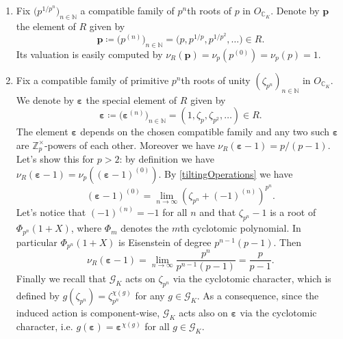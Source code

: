 \begin{ex}[]\leavevmode\vspace{-.2\baselineskip}\label{ExampleEltsTilt}
\begin{enumerate}
\item Fix $\big( p^{1/p^n} \big)_{n \in \mathbb{N}}$ 
	a compatible family of $p^n$th roots of $p$
	in $O_{\mathbb{C}_K}$.
	Denote by $\mathbf{p}$ the element of $R$ given by
	\begin{equation*}
		\mathbf{p} \coloneqq \big( p^{(n)} \big)_{n \in \mathbb{N}} =
		\big( p, p^{1/p}, p^{1/p^2}, \ldots \big) \in R
	.\end{equation*}
	Its valuation is easily computed by
	$\nu_R(\mathbf{p}) = \nu_p(p^{(0)}) = \nu_p(p) = 1$.

\item Fix a compatible family of primitive $p^n$th roots of unity
	$\left( \zeta_{p^n} \right)_{n \in \mathbb{N}}$ in $O_{\mathbb{C}_K}$.
	We denote by $\boldsymbol\varepsilon$ the special element of $R$ given by
	\begin{equation*}
		\boldsymbol\varepsilon \coloneqq \big( \boldsymbol\varepsilon^{(n)} \big)_{n \in \mathbb{N}} =
		\left( 1, \zeta_p, \zeta_{p^2}, \ldots \right) \in R
	.\end{equation*}
	The element $\boldsymbol\varepsilon$ depends on the chosen
	compatible family
	and any two such $\boldsymbol\varepsilon$
	are $\mathbb{Z}_{p}^{\times}$-powers of each other.
	Moreover we have
	$\nu_R \left( \boldsymbol\varepsilon - 1 \right) = p/ (p - 1)$.
	Let's show this for $p > 2$: by definition we have
	$\nu_R(\boldsymbol\varepsilon - 1) = \nu_p \left( (\boldsymbol\varepsilon -1 )^{(0)} \right)$.
	By \cref{tiltingOperations} we have
	\begin{equation*}
		\left( \boldsymbol\varepsilon -1 \right)^{(0)} =
		\lim_{n \to \infty} \left( \zeta_{p^n} + (-1)^{(n)} \right)^{p^n}
	.\end{equation*}
	Let's notice that $\left( -1 \right)^{(n)} = -1$ for all $n$
	and that $\zeta_{p^n} - 1$ is a root of $\Phi_{p^n}(1+X)$,
	where $\Phi_m$ denotes the $m$th cyclotomic polynomial.
	In particular $\Phi_{p^n}(1+X)$ is Eisenstein of degree
	$p^{n-1}(p-1)$.
	Then
	\begin{equation*}
		\nu_R(\boldsymbol\varepsilon - 1) =
		\lim_{n \to \infty} \frac{ p^n }{ p^{n-1}(p-1) } =
		\frac{ p }{ p-1 }
	.\end{equation*}
	Finally we recall that $\mathscr{G}_K$ acts on $\zeta_{p^n}$ via
	the cyclotomic character, which is defined by
	$g(\zeta_{p^n}) = \zeta_{p^n}^{\chi(g)}$ for any $g \in \mathscr{G}_K$.
	As a consequence, since the induced action is component-wise,
	$\mathscr{G}_K$ acts also on $\boldsymbol\varepsilon$ via the cyclotomic character,
	i.e. $g(\boldsymbol\varepsilon) = \boldsymbol\varepsilon^{\chi(g)}$
	for all $g \in \mathscr{G}_K$.
\end{enumerate}
\end{ex}


